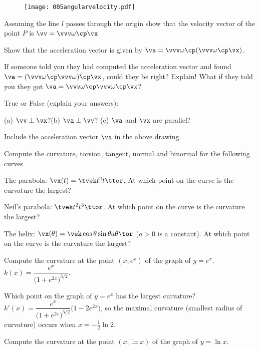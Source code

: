 \begin{figure}[h]
  \begin{center}
    \texttt{[image: 005angularvelocity.pdf]}
  \end{center}
\end{figure}


\subprob Assuming the line $l$ passes through the origin show that the
velocity vector of the point $P$ is $\vv = \vvv\omega \cp \vx$

\subprob Show that the acceleration vector is given by $\va =
\vvv\omega\cp(\vvv\omega\cp\vx)$.

\subprob If someone told you they had computed the acceleration vector
and found $\va =(\vvv\omega\cp\vvv\omega)\cp\vx$, could they be right?
Explain!  What if they told you they got $\va =
\vvv\omega\cp\vvv\omega\cp\vx$?

\subprob True or False (explain your answers):

(a) $\vv\perp \vx$?\qquad (b) $\va\perp \vv$? \qquad (c) $\va$ and
$\vx$ are parallel?

\subprob Include the acceleration vector $\va$ in the above drawing.

\problem Compute the curvature, torsion, tangent, normal and binormal%
for the following curves

\subprob The parabola: $\vx(t) = \tvek t^2 \\ t\ttor$.  At which point
on the curve is the curvature the largest?

\subprob Neil's parabola: $\tvek t^2\\ t^3\ttor$.  At which point on
the curve is the curvature the largest?

\subprob The helix: $\vx(\theta) =\vek\cos \theta \\ \sin \theta\\
a\theta\tor$ ($a>0$ is a constant).  At which point on the curve is
the curvature the largest?

\problem \subprob Compute the curvature at the point $(x, e^x)$ of the%
graph of $y=e^x$.
\answer $k(x) = \dfrac{e^x}%
{\bigl(1+e^{2x}\bigr)^{3/2}}$.
\endanswer

\subprob Which point on the graph of $y=e^x$ has the largest
curvature?
\answer $k'(x) = \dfrac{e^x} {\bigl(1+e^{2x}\bigr)^{5/2}}%
\bigl(1-2e^{2x}\bigr)$, so the maximal curvature (smallest radius of
curvature) occurs when $x=-\frac{1} {2}\ln{2}$.
\endanswer

\problem \subprob Compute the curvature at the point $(x, \ln x)$ of%
the graph of $y=\ln x$.

